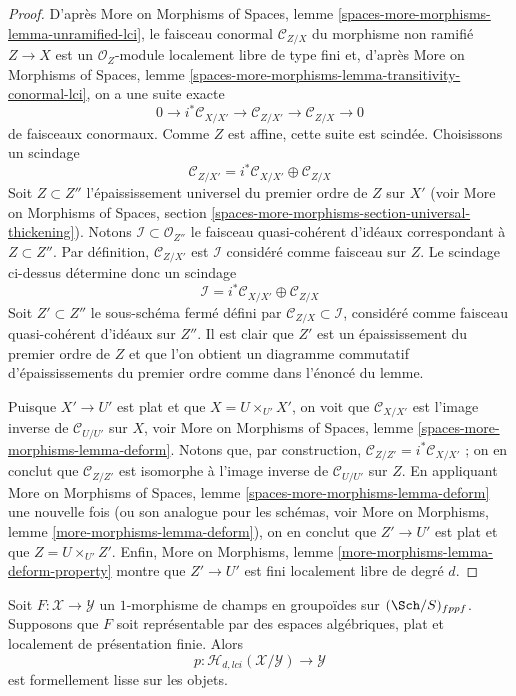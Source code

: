 \begin{proof}
D'après
More on Morphisms of Spaces,
lemme \ref{spaces-more-morphisms-lemma-unramified-lci},
le faisceau conormal $\mathcal{C}_{Z/X}$ du morphisme non ramifié $Z \to X$
est un $\mathcal{O}_Z$-module localement libre de type fini et, d'après
More on Morphisms of Spaces,
lemme \ref{spaces-more-morphisms-lemma-transitivity-conormal-lci},
on a une suite exacte
$$
0 \to i^*\mathcal{C}_{X/X'} \to
\mathcal{C}_{Z/X'} \to
\mathcal{C}_{Z/X} \to 0
$$
de faisceaux conormaux. Comme $Z$ est affine, cette suite est scindée. Choisissons
un scindage
$$
\mathcal{C}_{Z/X'} = i^*\mathcal{C}_{X/X'} \oplus \mathcal{C}_{Z/X}
$$
Soit $Z \subset Z''$ l'épaississement universel du premier ordre de $Z$
sur $X'$ (voir
More on Morphisms of Spaces,
section \ref{spaces-more-morphisms-section-universal-thickening}).
Notons $\mathcal{I} \subset \mathcal{O}_{Z''}$ le faisceau quasi-cohérent
d'idéaux correspondant à $Z \subset Z''$. Par définition,
$\mathcal{C}_{Z/X'}$ est $\mathcal{I}$ considéré comme faisceau sur $Z$.
Le scindage ci-dessus détermine donc un scindage
$$
\mathcal{I} = i^*\mathcal{C}_{X/X'} \oplus \mathcal{C}_{Z/X}
$$
Soit $Z' \subset Z''$ le sous-schéma fermé défini par
$\mathcal{C}_{Z/X} \subset \mathcal{I}$, considéré comme faisceau quasi-cohérent
d'idéaux sur $Z''$. Il est clair que $Z'$ est un épaississement du premier ordre
de $Z$ et que l'on obtient un diagramme commutatif d'épaississements du premier ordre
comme dans l'énoncé du lemme.

\medskip\noindent
Puisque $X' \to U'$ est plat et que $X = U \times_{U'} X'$, on voit que
$\mathcal{C}_{X/X'}$ est l'image inverse de $\mathcal{C}_{U/U'}$ sur $X$, voir
More on Morphisms of Spaces, lemme \ref{spaces-more-morphisms-lemma-deform}.
Notons que, par construction, $\mathcal{C}_{Z/Z'} = i^*\mathcal{C}_{X/X'}$ ;
on en conclut que $\mathcal{C}_{Z/Z'}$ est isomorphe à l'image inverse
de $\mathcal{C}_{U/U'}$ sur $Z$. En appliquant
More on Morphisms of Spaces, lemme \ref{spaces-more-morphisms-lemma-deform}
une nouvelle fois (ou son analogue pour les schémas, voir
More on Morphisms, lemme \ref{more-morphisms-lemma-deform}),
on en conclut que $Z' \to U'$ est plat et que $Z = U \times_{U'} Z'$.
Enfin,
More on Morphisms, lemme \ref{more-morphisms-lemma-deform-property}
montre que $Z' \to U'$ est fini localement libre de degré $d$.
\end{proof}

\begin{lemma}
\label{lemma-lci-formally-smooth}
Soit $F : \mathcal{X} \to \mathcal{Y}$ un $1$-morphisme de champs en groupoïdes
sur $(\Sch/S)_{fppf}$. Supposons que $F$ soit représentable par des espaces
algébriques, plat et localement de présentation finie. Alors
$$
p : \mathcal{H}_{d, lci}(\mathcal{X}/\mathcal{Y}) \to \mathcal{Y}
$$
est formellement lisse sur les objets.
\end{lemma}

